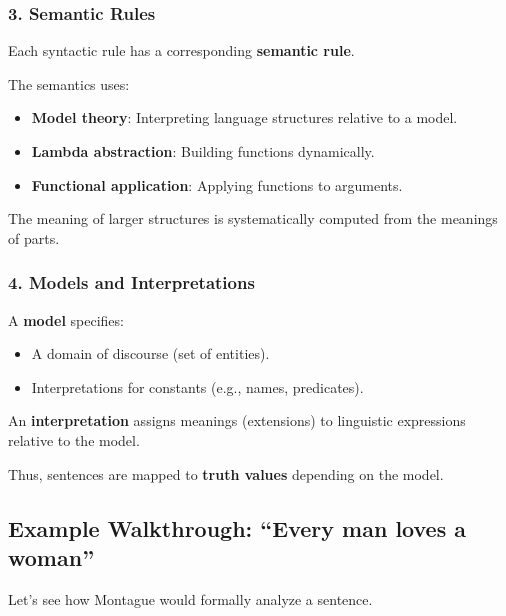 \documentclass[12pt]{article}
\newcommand{\tightlist}{\itemsep 0pt\parskip 0pt\parsep 0pt}
\begin{document}
\hypertarget{semantic-rules}{%
\subsubsection{\texorpdfstring{3. \textbf{Semantic
Rules}}{3. Semantic Rules}}\label{semantic-rules}}

Each syntactic rule has a corresponding \textbf{semantic rule}.

The semantics uses:

\begin{itemize}
\tightlist
\item
  \textbf{Model theory}: Interpreting language structures relative to a
  model.
\item
  \textbf{Lambda abstraction}: Building functions dynamically.
\item
  \textbf{Functional application}: Applying functions to arguments.
\end{itemize}

The meaning of larger structures is systematically computed from the
meanings of parts.

\hypertarget{models-and-interpretations}{%
\subsubsection{\texorpdfstring{4. \textbf{Models and
Interpretations}}{4. Models and Interpretations}}\label{models-and-interpretations}}

A \textbf{model} specifies:

\begin{itemize}
\tightlist
\item
  A domain of discourse (set of entities).
\item
  Interpretations for constants (e.g., names, predicates).
\end{itemize}

An \textbf{interpretation} assigns meanings (extensions) to linguistic
expressions relative to the model.

Thus, sentences are mapped to \textbf{truth values} depending on the
model.

\hypertarget{example-walkthrough-every-man-loves-a-woman}{%
\subsection{Example Walkthrough: ``Every man loves a
woman''}\label{example-walkthrough-every-man-loves-a-woman}}

Let's see how Montague would formally analyze a sentence.
\end{document}
